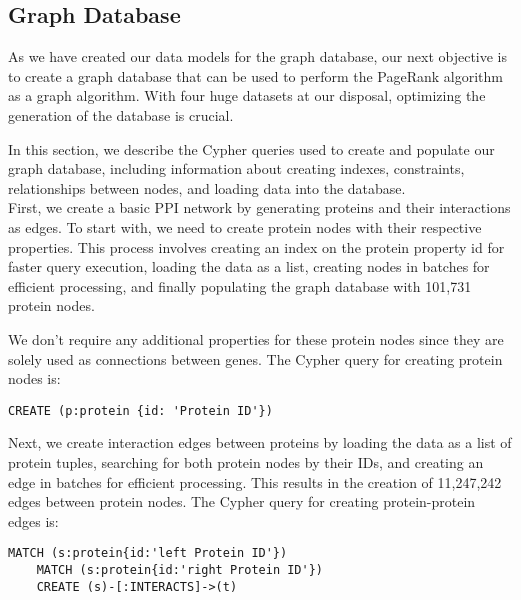 \subsection{Graph Database} \label{subsec:graph_database}

As we have created our data models for the graph database, our next objective is to create a graph database
that can be used to perform the PageRank algorithm as a graph algorithm.
With four huge datasets at our disposal, optimizing the generation of the database is crucial.

In this section, we describe the Cypher queries used to create and populate our graph database,
including information about creating indexes, constraints, relationships between nodes, and loading data into the database.\\


First, we create a basic PPI network by generating proteins and their interactions as edges.
To start with, we need to create protein nodes with their respective properties.
This process involves creating an index on the protein property id for faster query execution, loading the data as a list,
creating nodes in batches for efficient processing, and finally populating the graph database with 101,731 protein nodes.

We don't require any additional properties for these protein nodes since they are solely used as connections between genes.
The Cypher query for creating protein nodes is:

\begin{lstlisting}[language=Cypher, label={lst:protein_nodes}]
    CREATE (p:protein {id: 'Protein ID'})
\end{lstlisting}

Next, we create interaction  edges between proteins by loading the data as a list of protein tuples,
searching for both protein nodes by their IDs, and creating an edge in batches for efficient processing.
This results in the creation of 11,247,242 edges between protein nodes.
The Cypher query for creating protein-protein edges is:

\begin{lstlisting}[language=Cypher, label={lst:protein_edges}]
    MATCH (s:protein{id:'left Protein ID'})
    MATCH (s:protein{id:'right Protein ID'})
    CREATE (s)-[:INTERACTS]->(t)
\end{lstlisting}

